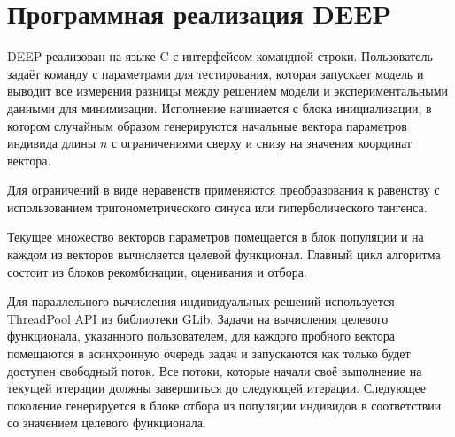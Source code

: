 \section*{Программная реализация DEEP}

DEEP реализован на языке C с интерфейсом командной строки.
Пользователь задаёт команду с параметрами для тестирования,
которая запускает модель и выводит все измерения
разницы между решением модели
и экспериментальными данными для минимизации.
Исполнение начинается с блока инициализации,
в котором случайным образом генерируются
начальные вектора параметров индивида
длины $n$
с ограничениями сверху и снизу
на значения координат вектора.

Для ограничений в виде неравенств
применяются преобразования к равенству
с использованием тригонометрического синуса
или гиперболического тангенса\cite{Kozlov11}.

Текущее множество векторов параметров помещается
в блок популяции и на каждом из векторов
вычисляется целевой функционал.
Главный цикл алгоритма состоит из блоков
рекомбинации, оценивания и отбора.

Для параллельного вычисления индивидуальных решений
используется ThreadPool API из библиотеки GLib.
Задачи на вычисления целевого функционала,
указанного пользователем,
для каждого пробного вектора
помещаются в асинхронную очередь задач
и запускаются как только будет доступен свободный поток. 
Все потоки, которые начали своё выполнение
на текущей итерации должны завершиться
до следующей итерации.
Следующее поколение генерируется в блоке отбора
из популяции индивидов в соответствии
со значением целевого функционала.

